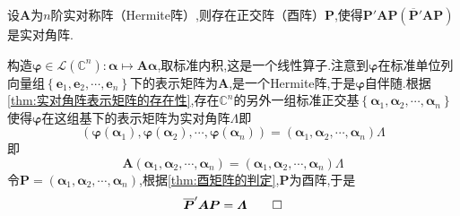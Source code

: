 \begin{formal}
    \begin{theorem}[化归实对角阵]\label{thm:化归实对角阵}
        设$\bm{A}$为$n$阶实对称阵（\textup{Hermite}阵）,则存在正交阵（酉阵）$\bm{P}$,使得$\bm{P}'\bm{AP}\left(\overline{\bm{P}}'\bm{AP}\right)$是实对角阵.
    \end{theorem}
    \begin{Proof}
        构造$\bm{\varphi}\in\mathcal{L}\left(\mathbb{C}^n\right):\bm{\alpha}\longmapsto\bm{A\alpha}$,取标准内积,这是一个线性算子.注意到$\bm{\varphi}$在标准单位列向量组$\left\{
            \bm{e}_1,\bm{e}_2,\cdots,\bm{e}_n
        \right\}$下的表示矩阵为$\bm{A}$,是一个\textup{Hermite}阵,于是$\bm{\varphi}$自伴随.根据\cref{thm:实对角阵表示矩阵的存在性},存在$\mathbb{C}^n$的另外一组标准正交基$\left\{
            \bm{\alpha}_1,\bm{\alpha}_2,\cdots,\bm{\alpha}_n
        \right\}$使得$\bm{\varphi}$在这组基下的表示矩阵为实对角阵$\bm{\varLambda}$即\[
        \left(
            \bm{\varphi}\left(
                \bm{\alpha}_1
            \right),\bm{\varphi}\left(
                \bm{\alpha}_2
            \right),\cdots,\bm{\varphi}\left(
                \bm{\alpha}_n
            \right)
        \right)=\left(
            \bm{\alpha}_1,\bm{\alpha}_2,\cdots,\bm{\alpha}_n
        \right)\bm{\varLambda}
        \]即\[
        \bm{A}\left(
            \bm{\alpha}_1,\bm{\alpha}_2,\cdots,\bm{\alpha}_n
        \right)=\left(
            \bm{\alpha}_1,\bm{\alpha}_2,\cdots,\bm{\alpha}_n
        \right)\bm{\varLambda}
        \]令$\bm{P}=\left(
            \bm{\alpha}_1,\bm{\alpha}_2,\cdots,\bm{\alpha}_n
        \right)$,根据\cref{thm:酉矩阵的判定},$\bm{P}$为酉阵,于是\[
        \overline{\bm{P}}'\bm{AP}=\bm{\varLambda}\qedhere
        \]
    \end{Proof}
\end{formal}
